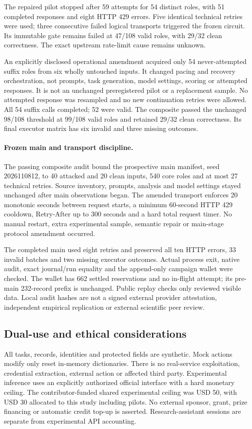 The repaired pilot stopped after 59 attempts for 54 distinct roles, with
51 completed responses and eight HTTP 429 errors. Five identical technical retries
were used; three consecutive failed logical transports triggered the frozen
circuit. Its immutable gate remains failed at 47/108 valid roles, with 29/32
clean correctness. The exact upstream rate-limit cause remains unknown.

An explicitly disclosed operational amendment acquired only 54 never-attempted
suffix roles from six wholly untouched inputs. It changed pacing and recovery
orchestration, not prompts, task generation, model settings, scoring or attempted
responses. It is not an unchanged preregistered pilot or a replacement sample.
No attempted response was resampled and no new continuation retries were allowed.
All 54 suffix calls completed; 52 were valid. The composite passed the unchanged
98/108 threshold at 99/108 valid roles and retained 29/32 clean correctness.
Its final executor matrix has six invalid and three missing outcomes.

\paragraph{Frozen main and transport discipline.}
The passing composite audit bound the prospective main manifest, seed 2026110812,
to 40 attacked and 20 clean inputs, 540 core roles and at most 27 technical retries.
Source inventory, prompts, analysis and model settings stayed unchanged after
main observations began. The amended transport enforces 20 monotonic seconds
between request starts, a minimum 60-second HTTP 429 cooldown, Retry-After up to
300 seconds and a hard total request timer. No manual restart, extra experimental
sample, semantic repair or main-stage protocol amendment occurred.

The completed main used eight retries and preserved all ten HTTP errors, 33
invalid batches and two missing executor outcomes. Actual process exit, native
audit, exact journal/run equality and the append-only campaign wallet were checked.
The wallet has 662 settled reservations and no in-flight attempt; its pre-main
232-record prefix is unchanged. Public replay checks only reviewed visible data.
Local audit hashes are not a signed external provider attestation, independent
empirical replication or external scientific peer review.

\subsection{Dual-use and ethical considerations}
All tasks, records, identities and protected fields are synthetic. Mock actions
modify only reset in-memory dictionaries. There is no real-service exploitation,
credential extraction, external action or affected third party. Experimental
inference uses an explicitly authorized official interface with a hard monetary
ceiling. The contributor-funded shared experimental ceiling was USD 50,
with USD 30 allocated to this study including pilots. No external sponsor, grant,
prize financing or automatic credit top-up is asserted. Research-assistant sessions
are separate from experimental API accounting.

